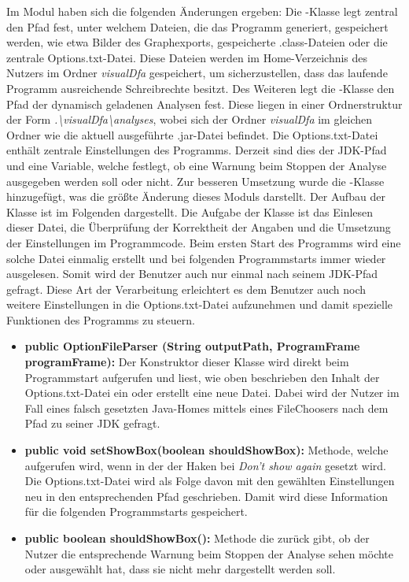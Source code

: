 Im Modul  haben sich die folgenden Änderungen ergeben: \newline
Die -Klasse legt zentral den Pfad fest, unter welchem Dateien, die das Programm generiert, gespeichert werden, wie etwa Bilder des Graphexports, gespeicherte .class-Dateien oder die zentrale Options.txt-Datei. Diese Dateien werden im Home-Verzeichnis des Nutzers im Ordner \textit{visualDfa} gespeichert, um sicherzustellen, dass das laufende Programm ausreichende Schreibrechte besitzt. Des Weiteren legt die -Klasse den Pfad der dynamisch geladenen Analysen fest. Diese liegen in einer Ordnerstruktur der Form \textit{.\textbackslash visualDfa\textbackslash analyses}, wobei sich der Ordner \textit{visualDfa} im gleichen Ordner wie die aktuell ausgeführte .jar-Datei befindet. \newline
Die Options.txt-Datei enthält zentrale Einstellungen des Programms. Derzeit sind dies der JDK-Pfad und eine Variable, welche festlegt, ob eine Warnung beim Stoppen der Analyse ausgegeben werden soll oder nicht. Zur besseren Umsetzung wurde die -Klasse hinzugefügt, was die größte Änderung dieses Moduls darstellt. Der Aufbau der Klasse ist im Folgenden dargestellt. Die Aufgabe der Klasse ist das Einlesen dieser Datei, die Überprüfung der Korrektheit der Angaben und die Umsetzung der Einstellungen im Programmcode. Beim ersten Start des Programms wird eine solche Datei einmalig erstellt und bei folgenden Programmstarts immer wieder ausgelesen. Somit wird der Benutzer auch nur einmal nach seinem JDK-Pfad gefragt. Diese Art der Verarbeitung erleichtert es dem Benutzer auch noch weitere Einstellungen in die Options.txt-Datei aufzunehmen und damit spezielle Funktionen des Programms zu steuern.\newline

\begin{itemize}
	\item \textbf{public OptionFileParser (String outputPath, ProgramFrame programFrame):} Der Konstruktor dieser Klasse wird direkt beim Programmstart aufgerufen und liest, wie oben beschrieben den Inhalt der Options.txt-Datei ein oder erstellt eine neue Datei. Dabei wird der Nutzer im Fall eines falsch gesetzten Java-Homes mittels eines FileChoosers nach dem Pfad zu seiner JDK gefragt.
	\item \textbf{public void setShowBox(boolean shouldShowBox):} Methode, welche aufgerufen wird, wenn in der  der Haken bei \textit{Don't show again} gesetzt wird. Die Options.txt-Datei wird als Folge davon mit den gewählten Einstellungen neu in den entsprechenden Pfad geschrieben. Damit wird diese Information für die folgenden Programmstarts gespeichert.
	\item \textbf{public boolean shouldShowBox():} Methode die zurück gibt, ob der Nutzer die entsprechende Warnung beim Stoppen der Analyse sehen möchte oder ausgewählt hat, dass sie nicht mehr dargestellt werden soll. 
\end{itemize}